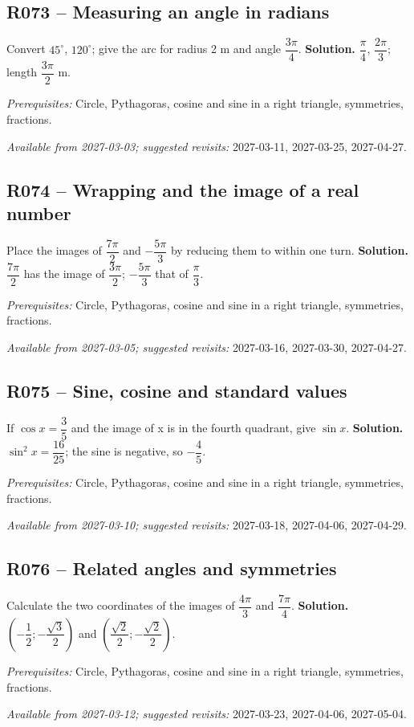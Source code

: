\subsection*{R073 -- Measuring an angle in radians}\label{R073}
Convert $45^\circ$, $120^\circ$; give the arc for radius 2 m and angle $\dfrac{3\pi}{4}$.
\ifprof\textbf{Solution.} $\dfrac{\pi}{4}$, $\dfrac{2\pi}{3}$; length $\dfrac{3\pi}{2}$ m.\par\textit{Prerequisites:} Circle, Pythagoras, cosine and sine in a right triangle, symmetries, fractions.\par\textit{Available from 2027-03-03; suggested revisits:} 2027-03-11, 2027-03-25, 2027-04-27.\fi
{}\subsection*{R074 -- Wrapping and the image of a real number}\label{R074}
Place the images of $\dfrac{7\pi}{2}$ and $-\dfrac{5\pi}{3}$ by reducing them to within one turn.
\ifprof\textbf{Solution.} $\dfrac{7\pi}{2}$ has the image of $\dfrac{3\pi}{2}$; $-\dfrac{5\pi}{3}$ that of $\dfrac{\pi}{3}$.\par\textit{Prerequisites:} Circle, Pythagoras, cosine and sine in a right triangle, symmetries, fractions.\par\textit{Available from 2027-03-05; suggested revisits:} 2027-03-16, 2027-03-30, 2027-04-27.\fi
{}\subsection*{R075 -- Sine, cosine and standard values}\label{R075}
If $\cos x=\dfrac{3}{5}$ and the image of x is in the fourth quadrant, give $\sin x$.
\ifprof\textbf{Solution.} $\sin ^2x=\dfrac{16}{25}$; the sine is negative, so $-\dfrac{4}{5}$.\par\textit{Prerequisites:} Circle, Pythagoras, cosine and sine in a right triangle, symmetries, fractions.\par\textit{Available from 2027-03-10; suggested revisits:} 2027-03-18, 2027-04-06, 2027-04-29.\fi
{}\subsection*{R076 -- Related angles and symmetries}\label{R076}
Calculate the two coordinates of the images of $\dfrac{4\pi}{3}$ and $\dfrac{7\pi}{4}$.
\ifprof\textbf{Solution.} $(-\dfrac{1}{2};-\dfrac{\sqrt 3}{2})$ and $(\dfrac{\sqrt 2}{2};-\dfrac{\sqrt 2}{2})$.\par\textit{Prerequisites:} Circle, Pythagoras, cosine and sine in a right triangle, symmetries, fractions.\par\textit{Available from 2027-03-12; suggested revisits:} 2027-03-23, 2027-04-06, 2027-05-04.\fi
